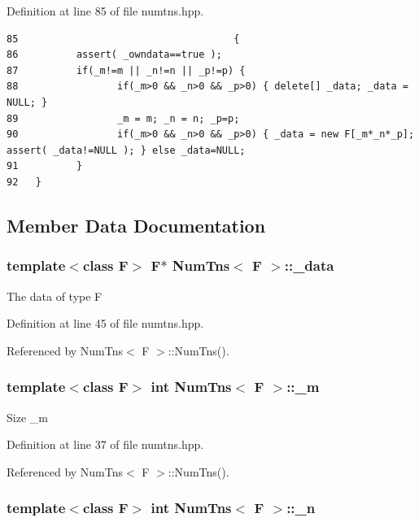 Definition at line 85 of file numtns.hpp.

\footnotesize\begin{verbatim}85                                     {
86          assert( _owndata==true );
87          if(_m!=m || _n!=n || _p!=p) {
88                 if(_m>0 && _n>0 && _p>0) { delete[] _data; _data = NULL; } 
89                 _m = m; _n = n; _p=p;
90                 if(_m>0 && _n>0 && _p>0) { _data = new F[_m*_n*_p]; assert( _data!=NULL ); } else _data=NULL;
91          }
92   }
\end{verbatim}\normalsize 




\subsection{Member Data Documentation}
\subsubsection{\setlength{\rightskip}{0pt plus 5cm}template$<$class F$>$ F$\ast$ {\bf Num\-Tns}$<$ F $>$::{\bf \_\-data}}\label{classNumTns_7125153abbcb2e949a1b4f81cbe22af5_7125153abbcb2e949a1b4f81cbe22af5}


The data of type F 

Definition at line 45 of file numtns.hpp.

Referenced by Num\-Tns$<$ F $>$::Num\-Tns().
\subsubsection{\setlength{\rightskip}{0pt plus 5cm}template$<$class F$>$ int {\bf Num\-Tns}$<$ F $>$::{\bf \_\-m}}\label{classNumTns_b781ae81625400d76d94420d3af2c230_b781ae81625400d76d94420d3af2c230}


Size \_\-m 

Definition at line 37 of file numtns.hpp.

Referenced by Num\-Tns$<$ F $>$::Num\-Tns().
\subsubsection{\setlength{\rightskip}{0pt plus 5cm}template$<$class F$>$ int {\bf Num\-Tns}$<$ F $>$::{\bf \_\-n}}\label{classNumTns_b628b96b5cc160f67acf6b4673cdd8bb_b628b96b5cc160f67acf6b4673cdd8bb}


